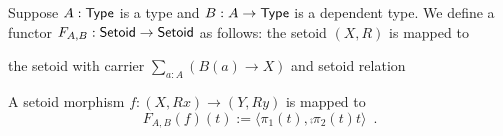 

\begin{definition}\label{def:poly_functor}
 Suppose $A : \mathsf{Type}$ is a type and $B: A \to \mathsf{Type}$ is a dependent type.
 We define a functor $F_{A,B} : \mathsf{Setoid} \to \mathsf{Setoid}$ as follows:
 the setoid $(X,R)$ is mapped to

 the setoid with carrier $\sum_{a:A}(B(a) \to X)$ and setoid relation
 
 A setoid morphism $f : (X,Rx) \to (Y,Ry)$ is mapped to 
 \[F_{A,B}(f) (t):= \langle \pi_1(t), \comp{\pi_2(t)}{t} \rangle \enspace . \]
 
 
\end{definition}


